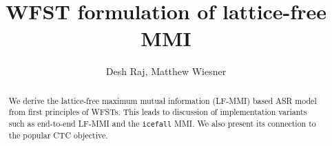 \documentclass{article}
\title{WFST formulation of lattice-free MMI}
\author{Desh Raj, Matthew Wiesner}
\begin{document}
\maketitle

\begin{abstract}
We derive the lattice-free maximum mutual information (LF-MMI) based ASR model from first principles of WFSTs. 
%
This leads to discussion of implementation variants such as end-to-end LF-MMI and the \texttt{icefall} MMI. 
%
We also present its connection to the popular CTC objective. 
\end{abstract}











\end{document}
